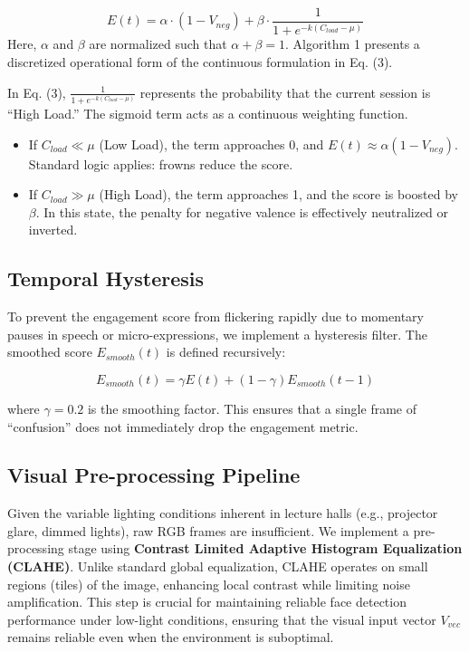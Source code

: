 \documentclass[conference]{IEEEtran}
\begin{document}
\begin{equation}
E(t) = \alpha \cdot (1 - V_{neg}) + \beta \cdot \frac{1}{1 + e^{-k(C_{load} - \mu)}}
\end{equation}
Here, $\alpha$ and $\beta$ are normalized such that $\alpha + \beta = 1$.
Algorithm 1 presents a discretized operational form of the continuous formulation in Eq. (3).

In Eq. (3), $\frac{1}{1 + e^{-k(C_{load} - \mu)}}$ represents the probability that the current session is ``High Load.'' The sigmoid term acts as a continuous weighting function.
\begin{itemize}
    \item If $C_{load} \ll \mu$ (Low Load), the term approaches 0, and $E(t) \approx \alpha(1 - V_{neg})$. Standard logic applies: frowns reduce the score.
    \item If $C_{load} \gg \mu$ (High Load), the term approaches 1, and the score is boosted by $\beta$. In this state, the penalty for negative valence is effectively neutralized or inverted.
\end{itemize}

\subsection{Temporal Hysteresis}
To prevent the engagement score from flickering rapidly due to momentary pauses in speech or micro-expressions, we implement a hysteresis filter. The smoothed score $E_{smooth}(t)$ is defined recursively:

\begin{equation}
E_{smooth}(t) = \gamma E(t) + (1-\gamma) E_{smooth}(t-1)
\end{equation}

where $\gamma = 0.2$ is the smoothing factor. This ensures that a single frame of ``confusion'' does not immediately drop the engagement metric.

\subsection{Visual Pre-processing Pipeline}
Given the variable lighting conditions inherent in lecture halls (e.g., projector glare, dimmed lights), raw RGB frames are insufficient. We implement a pre-processing stage using \textbf{Contrast Limited Adaptive Histogram Equalization (CLAHE)}. Unlike standard global equalization, CLAHE operates on small regions (tiles) of the image, enhancing local contrast while limiting noise amplification. This step is crucial for maintaining reliable face detection performance under low-light conditions, ensuring that the visual input vector $V_{vec}$ remains reliable even when the environment is suboptimal.
\end{document}
